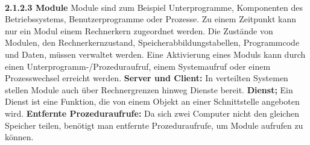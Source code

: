\documentclass{article}
\begin{document}
    \\
    \textbf{2.1.2.3 Module}\newline
    Module sind zum Beispiel Unterprogramme, Komponenten des Betriebssystems, Benutzerprogramme oder Prozesse. Zu einem Zeitpunkt kann nur ein Modul einem Rechnerkern zugeordnet werden. Die Zustände von Modulen, den Rechnerkernzustand, Speicherabbildungstabellen, Programmcode und Daten, müssen verwaltet werden. Eine Aktivierung eines Moduls kann durch einen Unterprogramm-/Prozeduraufruf, einem Systemaufruf oder einem Prozesswechsel erreicht werden.\newline
    \textbf{Server und Client:}\newline
    In verteilten Systemen stellen Module auch über Rechnergrenzen hinweg Dienste bereit.\newline
    \textbf{Dienst;}\newline
    Ein Dienst ist eine Funktion, die von einem Objekt an einer Schnittstelle angeboten wird.\newline
    \textbf{Entfernte Prozeduraufrufe:}\newline
    Da sich zwei Computer nicht den gleichen Speicher teilen, benötigt man entfernte Prozeduraufrufe, um Module aufrufen zu können.
\end{document}

